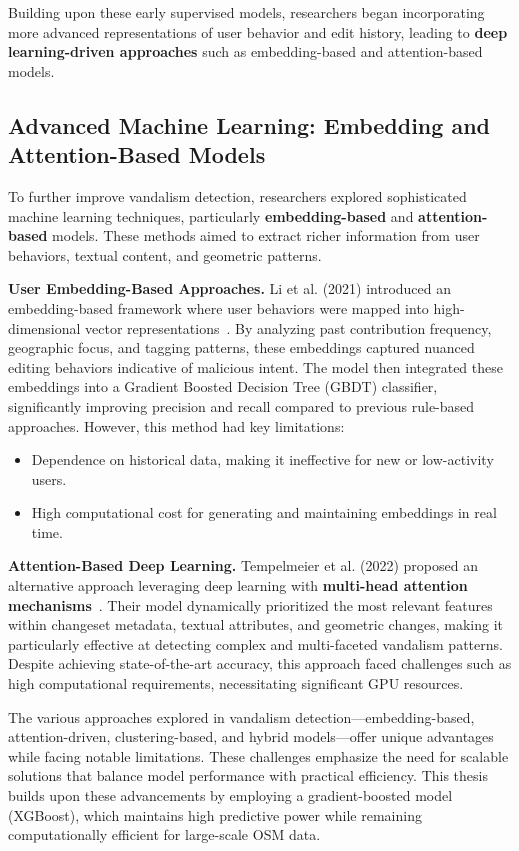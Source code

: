 \documentclass[
    13pt, %
    a4paper, %
    listof=totoc, %
    bibliography=totoc, %
    index=totoc, %
    headsepline
]{scrreprt}
\begin{document}
Building upon these early supervised models, researchers began incorporating more advanced representations of user behavior and edit history, leading to \textbf{deep learning-driven approaches} such as embedding-based and attention-based models.

\subsection{Advanced Machine Learning: Embedding and Attention-Based Models}
\label{sec:advanced_ml_methods}

To further improve vandalism detection, researchers explored sophisticated machine learning techniques, particularly \textbf{embedding-based} and \textbf{attention-based} models. These methods aimed to extract richer information from user behaviors, textual content, and geometric patterns.

\textbf{User Embedding-Based Approaches.}  
Li et al. (2021) introduced an embedding-based framework where user behaviors were mapped into high-dimensional vector representations~\cite{Li2021}. By analyzing past contribution frequency, geographic focus, and tagging patterns, these embeddings captured nuanced editing behaviors indicative of malicious intent. The model then integrated these embeddings into a Gradient Boosted Decision Tree (GBDT) classifier, significantly improving precision and recall compared to previous rule-based approaches. However, this method had key limitations:
\begin{itemize}
    \item Dependence on historical data, making it ineffective for new or low-activity users.
    \item High computational cost for generating and maintaining embeddings in real time.
\end{itemize}

\textbf{Attention-Based Deep Learning.}  
Tempelmeier et al. (2022) proposed an alternative approach leveraging deep learning with \textbf{multi-head attention mechanisms}~\cite{Tempelmeier2022}. Their model dynamically prioritized the most relevant features within changeset metadata, textual attributes, and geometric changes, making it particularly effective at detecting complex and multi-faceted vandalism patterns. Despite achieving state-of-the-art accuracy, this approach faced challenges such as high computational requirements, necessitating significant GPU resources.

\vspace{1em}
\noindent
The various approaches explored in vandalism detection—embedding-based, attention-driven, clustering-based, and hybrid models—offer unique advantages while facing notable limitations. 
These challenges emphasize the need for scalable solutions that balance model performance with practical efficiency. This thesis builds upon these advancements by employing
a gradient-boosted model (XGBoost), which maintains high predictive power while remaining computationally efficient for large-scale OSM data.
\end{document}
